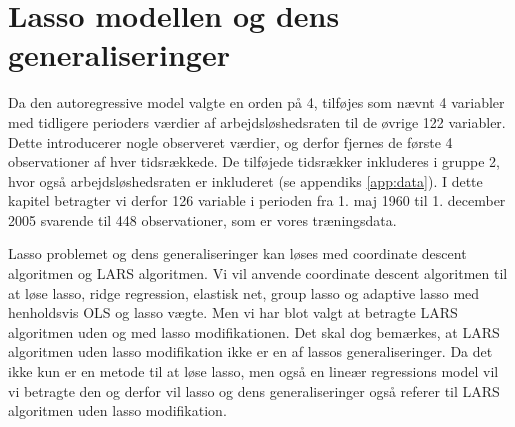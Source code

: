 \chapter{Lasso modellen og dens generaliseringer}
Da den autoregressive model valgte en orden på 4, tilføjes som nævnt 
4 variabler med tidligere perioders værdier af arbejdsløshedsraten til de øvrige 122 variabler. 
Dette introducerer nogle observeret værdier, og derfor fjernes de første 4 observationer af hver tidsrækkede.
De tilføjede tidsrækker inkluderes i gruppe 2, hvor også arbejdsløshedsraten er inkluderet (se appendiks \ref{app:data}).
I dette kapitel betragter vi derfor 126 variable i perioden fra 1. maj 1960 til 1. december 2005 svarende til 448 observationer, som er vores træningsdata. 

Lasso problemet og dens generaliseringer kan løses med coordinate descent algoritmen og LARS algoritmen.
Vi vil anvende coordinate descent algoritmen til at løse lasso, ridge regression, elastisk net, group lasso og adaptive lasso med henholdsvis OLS og lasso vægte.
Men vi har blot valgt at betragte LARS algoritmen uden og med lasso modifikationen.
Det skal dog bemærkes, at LARS algoritmen uden lasso modifikation ikke er en af lassos generaliseringer.
Da det ikke kun er en metode til at løse lasso, men også en lineær regressions model vil vi betragte den og derfor vil lasso og dens generaliseringer også referer til LARS algoritmen uden lasso modifikation.  





